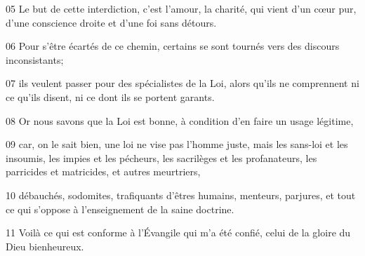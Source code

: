 
05 Le but de cette interdiction, c’est l’amour, la charité, qui vient d’un cœur pur, d’une conscience droite et d’une foi sans détours.

06 Pour s’être écartés de ce chemin, certains se sont tournés vers des discours inconsistants;

07 ils veulent passer pour des spécialistes de la Loi, alors qu’ils ne comprennent ni ce qu’ils disent, ni ce dont ils se portent garants.

08 Or nous savons que la Loi est bonne, à condition d’en faire un usage légitime,

09 car, on le sait bien, une loi ne vise pas l’homme juste, mais les sans-loi et les insoumis, les impies et les pécheurs, les sacrilèges et les profanateurs, les parricides et matricides, et autres meurtriers,

10 débauchés, sodomites, trafiquants d’êtres humains, menteurs, parjures, et tout ce qui s’oppose à l’enseignement de la saine doctrine.

11 Voilà ce qui est conforme à l’Évangile qui m’a été confié, celui de la gloire du Dieu bienheureux.
